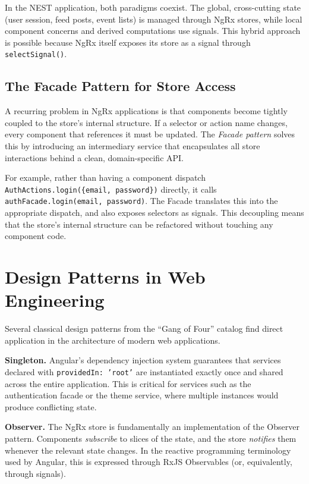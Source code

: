 In the NEST application, both paradigms coexist. The global, cross-cutting state (user session, feed posts, event lists) is managed through NgRx stores, while local component concerns and derived computations use signals. This hybrid approach is possible because NgRx itself exposes its store as a signal through \texttt{selectSignal()}.

\subsection{The Facade Pattern for Store Access}

A recurring problem in NgRx applications is that components become tightly coupled to the store's internal structure. If a selector or action name changes, every component that references it must be updated. The \textit{Facade pattern} \cite{gamma1994design} solves this by introducing an intermediary service that encapsulates all store interactions behind a clean, domain-specific API.

For example, rather than having a component dispatch \texttt{AuthActions.login(\{email, password\})} directly, it calls \texttt{authFacade.login(email, password)}. The Facade translates this into the appropriate dispatch, and also exposes selectors as signals. This decoupling means that the store's internal structure can be refactored without touching any component code.

\section{Design Patterns in Web Engineering}

Several classical design patterns from the ``Gang of Four'' catalog \cite{gamma1994design} find direct application in the architecture of modern web applications.

\textbf{Singleton.} Angular's dependency injection system guarantees that services declared with \texttt{providedIn: 'root'} are instantiated exactly once and shared across the entire application. This is critical for services such as the authentication facade or the theme service, where multiple instances would produce conflicting state.

\textbf{Observer.} The NgRx store is fundamentally an implementation of the Observer pattern. Components \textit{subscribe} to slices of the state, and the store \textit{notifies} them whenever the relevant state changes. In the reactive programming terminology used by Angular, this is expressed through RxJS Observables (or, equivalently, through signals).

